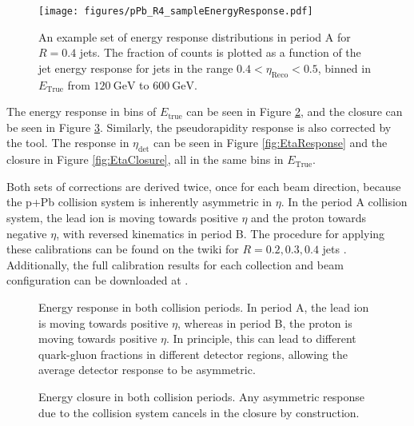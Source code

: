 \documentclass[NOTE, atlasdraft=true, texlive=2016, USenglish]{\ATLASLATEXPATH atlasdoc}
\begin{document}
\begin{figure}[htbp]
	\centering
	\texttt{[image: figures/pPb\_R4\_sampleEnergyResponse.pdf]}
	\caption{An example set of energy response distributions in period A for $R=0.4$ jets. The fraction of counts is plotted as a function of the jet energy response for jets in the range $0.4<\eta_{\text{Reco}}<0.5$, binned in $E_{\text{True}}$ from $\SI{120}{\GeV}$ to $\SI{600}{\GeV}$.}
	\label{fig:SampleEnergyResponse}
\end{figure}\par
The energy response in bins of $E_{\text{true}}$ can be seen in Figure \ref{fig:EnergyResponse}, and the closure can be seen in Figure \ref{fig:EnergyClosure}. Similarly, the pseudorapidity response is also corrected by the tool. The response in $\eta_{\text{det}}$ can be seen in Figure \ref{fig:EtaResponse} and the closure in Figure \ref{fig:EtaClosure}, all in the same bins in $E_{\text{True}}$.\par
Both sets of corrections are derived twice, once for each beam direction, because the p+Pb collision system is inherently asymmetric in $\eta$. In the period A collision system, the lead ion is moving towards positive $\eta$ and the proton towards negative $\eta$, with reversed kinematics in period B. The procedure for applying these calibrations can be found on the twiki for $R=0.2, 0.3, 0.4$ jets \cite{HIRun2JESdata2016}. Additionally, the full calibration results for each collection and beam configuration can be downloaded at \cite{pPbR4,pPbR3,pPbR2,PbpR4,PbpR3,PbpR2}.

\begin{figure}[htbp]
	\centering
	\caption{Energy response in both collision periods. In period A, the lead ion is moving towards positive $\eta$, whereas in period B, the proton is moving towards positive $\eta$. In principle, this can lead to different quark-gluon fractions in different detector regions, allowing the average detector response to be asymmetric.}
	\label{fig:EnergyResponse}
\end{figure}

\begin{figure}[htbp]
	\centering
	\caption{Energy closure in both collision periods. Any asymmetric response due to the collision system cancels in the closure by construction.}
	\label{fig:EnergyClosure}
\end{figure}
\end{document}

